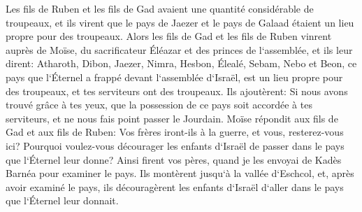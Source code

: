 \verse Les fils de Ruben et les fils de Gad avaient une quantité considérable de troupeaux, et ils virent que le pays de Jaezer et le pays de Galaad étaient un lieu propre pour des troupeaux. 
\verse Alors les fils de Gad et les fils de Ruben vinrent auprès de Moïse, du sacrificateur Éléazar et des princes de l`assemblée, et ils leur dirent: 
\verse Atharoth, Dibon, Jaezer, Nimra, Hesbon, Élealé, Sebam, Nebo et Beon, 
\verse ce pays que l`Éternel a frappé devant l`assemblée d`Israël, est un lieu propre pour des troupeaux, et tes serviteurs ont des troupeaux. 
\verse Ils ajoutèrent: Si nous avons trouvé grâce à tes yeux, que la possession de ce pays soit accordée à tes serviteurs, et ne nous fais point passer le Jourdain. 
\verse Moïse répondit aux fils de Gad et aux fils de Ruben: Vos frères iront-ils à la guerre, et vous, resterez-vous ici? 
\verse Pourquoi voulez-vous décourager les enfants d`Israël de passer dans le pays que l`Éternel leur donne? 
\verse Ainsi firent vos pères, quand je les envoyai de Kadès Barnéa pour examiner le pays. 
\verse Ils montèrent jusqu`à la vallée d`Eschcol, et, après avoir examiné le pays, ils découragèrent les enfants d`Israël d`aller dans le pays que l`Éternel leur donnait. 
